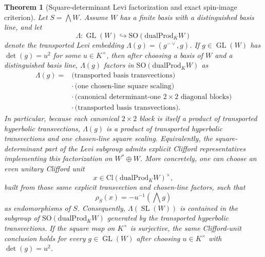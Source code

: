 \documentclass{birkjour}
\theoremstyle{plain}
\newtheorem{theorem}{Theorem}[section]
\theoremstyle{definition}
\theoremstyle{remark}
\newcommand{\Cl}{\mathrm{Cl}}
\newcommand{\SO}{\mathrm{SO}}
\newcommand{\dualProd}{\mathrm{dualProd}}
\begin{document}
\begin{theorem}[Square-determinant Levi factorization and exact spin-image criterion]
\label{thm:square-det-levi}
Let $S=\bigwedge W$. Assume $W$ has a finite basis with a distinguished basis
line, and let
\[
  \Lambda:\operatorname{GL}(W)\hookrightarrow \SO(\dualProd_K W)
\]
denote the transported Levi embedding $\Lambda(g)=(g^{-{\vee}},g)$. If
$g\in \operatorname{GL}(W)$ has $\det(g)=u^2$ for some $u\in K^\times$, then
after choosing a basis of $W$ and a distinguished basis line, $\Lambda(g)$
factors in
$\SO(\dualProd_K W)$ as
\[
  \begin{aligned}
  \Lambda(g) ={}&
    \text{(transported basis transvections)} \\
    &\cdot\, \text{(one chosen-line square scaling)} \\
    &\cdot\, \text{(canonical determinant-one $2\times 2$ diagonal blocks)} \\
    &\cdot\, \text{(transported basis transvections)}.
  \end{aligned}
\]
In particular, because each canonical $2\times2$ block is itself a product of
transported hyperbolic transvections, $\Lambda(g)$ is a product of transported
hyperbolic transvections and one chosen-line square scaling. Equivalently, the
square-determinant part of the Levi subgroup admits explicit Clifford
representatives implementing this factorization on $W^*\oplus W$. More
concretely,
one can choose an even unitary Clifford unit
\[
  x\in \Cl(\dualProd_K W)^\times,
\]
built from those same explicit transvection and chosen-line factors, such that
\[
  \rho_S(x)=-u^{-1}(\bigwedge g)
\]
as endomorphisms of $S$. Consequently, $\Lambda(\operatorname{SL}(W))$ is
contained in the subgroup of
$\SO(\dualProd_K W)$ generated by the transported hyperbolic transvections.
If the square map on $K^\times$ is surjective, the same Clifford-unit conclusion
holds for every $g\in\operatorname{GL}(W)$ after choosing
$u\in K^\times$ with $\det(g)=u^2$.


\end{theorem}
\end{document}
